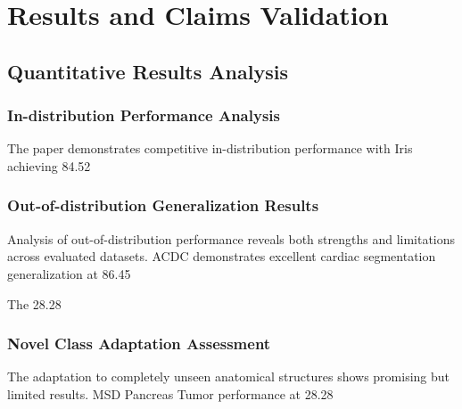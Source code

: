 \section{Results and Claims Validation}
\label{sec:results_validation}

\subsection{Quantitative Results Analysis}
\subsubsection{In-distribution Performance Analysis}
The paper demonstrates competitive in-distribution performance with Iris achieving 84.52%

\subsubsection{Out-of-distribution Generalization Results}
Analysis of out-of-distribution performance reveals both strengths and limitations across evaluated datasets. ACDC demonstrates excellent cardiac segmentation generalization at 86.45%

The 28.28%

\subsubsection{Novel Class Adaptation Assessment}
The adaptation to completely unseen anatomical structures shows promising but limited results. MSD Pancreas Tumor performance at 28.28%

